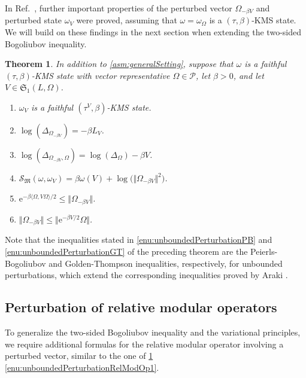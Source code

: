 \documentclass[a4paper, twoside, 11pt, reqno]{amsart}
\theoremstyle{definition}
\theoremstyle{plain}
\newtheorem{theorem}[definition]{Theorem}
\renewcommand{\Delta}{\varDelta}
\renewcommand{\Omega}{\varOmega}
\newcommand{\MS}{\mathcal{S}}
\newcommand{\MFM}{\mathfrak{M}}
\newcommand{\MFS}{\mathfrak{S}}
\newcommand{\ee}{\mathrm{e}}
\newcommand{\NPC}{\mathcal{P}}
\newcommand{\1}{\mathbf{1}}
\newcommand{\norm}[2][]{#1\Vert{#2}#1\Vert}
\newcommand{\braket}[2][]{#1\langle{#2}#1\rangle}
\begin{document}
In Ref.~\cite[Thm. 5.5]{DJP03}, further important properties of the perturbed vector $\Omega_{- \beta V}$ and perturbed state $\omega_V$ were proved, assuming that $\omega = \omega_\Omega$ is a $(\tau, \beta)$-KMS state. We will build on these findings in the next section when extending the two-sided Bogoliubov inequality.

\begin{theorem}\label{thm:unboundedPerturbationsKMS}
    In addition to \cref{asm:generalSetting}, suppose that $\omega$ is a faithful $(\tau, \beta)$-KMS state with vector representative $\Omega \in \NPC$, let $\beta > 0$, and let $V \in \MFS_1(L, \Omega)$.
    \begin{enumerate}
        \item \label{enu:unboundedPerturbationKMS} $\omega_V$ is a faithful $(\tau^V, \beta)$-KMS state.
        \item \label{enu:unboundedPerturbationModOp} $\log(\Delta_{\Omega_{- \beta V}}) = - \beta L_V$.
        \item \label{enu:unboundedPerturbationRelModOp1} $\log(\Delta_{\Omega_{- \beta V}, \Omega}) = \log(\Delta_\Omega) - \beta V$.
        \item \label{enu:unboundedPerturbationRelEnt1} $\MS_\MFM(\omega, \omega_V) = \beta \omega(V) + \log\bigl(\norm{\Omega_{- \beta V}}^2\bigr)$.
        \item \label{enu:unboundedPerturbationPB} $\ee^{- \beta \braket{\Omega, V \Omega} / 2} \le \norm{\Omega_{- \beta V}}$.
        \item \label{enu:unboundedPerturbationGT} $\norm{\Omega_{- \beta V}} \le \norm{\ee^{- \beta V / 2} \Omega}$.
    \end{enumerate}
\end{theorem}

Note that the inequalities stated in \ref{enu:unboundedPerturbationPB} and \ref{enu:unboundedPerturbationGT} of the preceding theorem are the Peierls-Bogoliubov and Golden-Thompson inequalities, respectively, for unbounded perturbations, which extend the corresponding inequalities proved by Araki \cite[Thm. 1 and 2]{Araki1973b}.


\subsection{Perturbation of relative modular operators}\label{subsec:perturbationRelModOp}

To generalize the two-sided Bogoliubov inequality and the variational principles, we require additional formulas for the relative modular operator involving a perturbed vector, similar to the one of \cref{thm:unboundedPerturbationsKMS} \ref{enu:unboundedPerturbationRelModOp1}.
\end{document}

